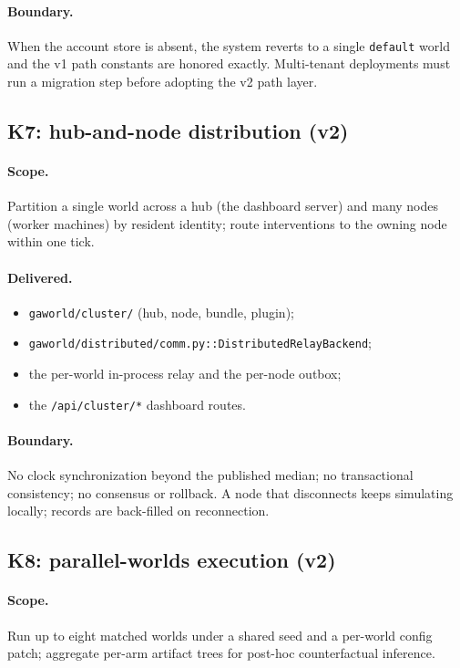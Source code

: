 \paragraph{Boundary.}
When the account store is absent, the system reverts to a single
\texttt{default} world and the v1 path constants are honored exactly.
Multi-tenant deployments must run a migration step before adopting
the v2 path layer.

\subsection{K7: hub-and-node distribution (v2)}

\paragraph{Scope.}  Partition a single world across a hub (the dashboard
server) and many nodes (worker machines) by resident identity; route
interventions to the owning node within one tick.

\paragraph{Delivered.}
\begin{itemize}[leftmargin=*]
  \item \texttt{gaworld/cluster/} (hub, node, bundle, plugin);
  \item \texttt{gaworld/distributed/comm.py::DistributedRelayBackend};
  \item the per-world in-process relay and the per-node outbox;
  \item the \texttt{/api/cluster/*} dashboard routes.
\end{itemize}

\paragraph{Boundary.}
No clock synchronization beyond the published median; no
transactional consistency; no consensus or rollback.  A node that
disconnects keeps simulating locally; records are back-filled on
reconnection.

\subsection{K8: parallel-worlds execution (v2)}

\paragraph{Scope.}  Run up to eight matched worlds under a shared seed
and a per-world config patch; aggregate per-arm artifact trees for
post-hoc counterfactual inference.

